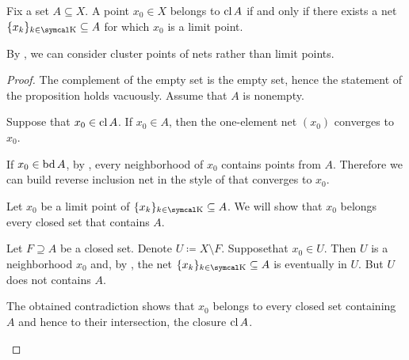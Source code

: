\begin{Proposition}\label{thm:limit_point_iff_in_closure}\cite[proposition 1.6.3]{Engelking1989}
  Fix a set \( A \subseteq X \). A point \( x_0 \in X \) belongs to \( \operatorname{cl}{A} \) if and only if there exists a net \( \{ x_k \}_{k \in \CK} \subseteq A \) for which \( x_0 \) is a limit point.

  By , we can consider cluster points of nets rather than limit points.
\end{Proposition}
\begin{proof}
  The complement of the empty set is the empty set, hence the statement of the proposition holds vacuously. Assume that \( A \) is nonempty.

  \begin{RefList}
    \ISufficiency Suppose that \( x_0 \in \operatorname{cl}{A} \). If \( x_0 \in A \), then the one-element net \( (x_0) \) converges to \( x_0 \).

    If \( x_0 \in \operatorname{bd}{A} \), by , every neighborhood of \( x_0 \) contains points from \( A \). Therefore we can build reverse inclusion net in the style of  that converges to \( x_0 \).

    \INecessity Let \( x_0 \) be a limit point of \( \{ x_k \}_{k \in \CK} \subseteq A \). We will show that \( x_0 \) belongs every closed set that contains \( A \).

    Let \( F \supseteq A \) be a closed set. Denote \( U \coloneqq X \setminus F \). Suppose\LEM that \( x_0 \in U \). Then \( U \) is a neighborhood \( x_0 \) and, by , the net \( \{ x_k \}_{k \in \CK} \subseteq A \) is eventually in \( U \). But \( U \) does not contains \( A \).

    The obtained contradiction shows that \( x_0 \) belongs to every closed set containing \( A \) and hence to their intersection, the closure \( \operatorname{cl} A \).
  \end{RefList}
\end{proof}

